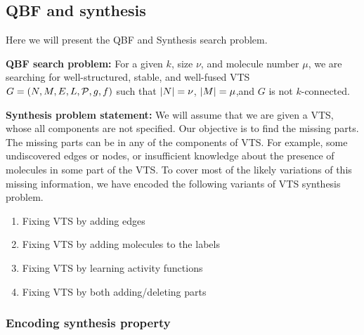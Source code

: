 \subsection{QBF and synthesis}
Here we will present the QBF and Synthesis search problem.

 \textbf{QBF search problem:}
For a given $k$, size $\nu$, and molecule number $\mu$,
we are searching for well-structured, stable, and well-fused VTS
$G = (N,M,E,L,\mathcal{P},g,f)$ such that
$|N| = \nu$, $|M| = \mu$,and
$G$ is not $k$-connected.    

%

\textbf{Synthesis problem statement:}
We will assume that we are given a VTS, whose all components
are not specified.
%
Our objective is to find the missing parts.
%
The missing parts can be in any of the components of VTS. 
%
For example, some undiscovered edges or nodes, or insufficient
knowledge about the presence of molecules in some part of the VTS.
%
To cover most of the likely variations of this missing information,
we have encoded the following variants of VTS synthesis problem.

\begin{enumerate}
	\item Fixing VTS by adding edges 
	\item Fixing VTS by adding molecules to the labels
	\item Fixing VTS by learning activity functions
	\item  Fixing VTS by both adding/deleting parts
\end{enumerate}

\subsubsection{Encoding synthesis property}

